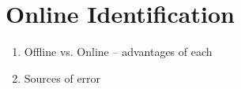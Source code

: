 \section{Online Identification}


\begin{enumerate}
  \item Offline vs. Online -- advantages of each
  \item Sources of error
\end{enumerate}








